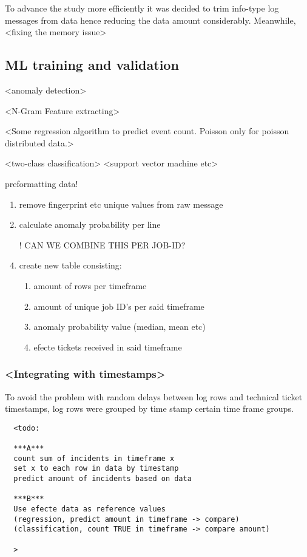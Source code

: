 To advance the study more efficiently
it was decided to trim info-type log messages from data
hence reducing the data amount considerably.
Meanwhile,
<fixing the memory issue>

\subsection{ML training and validation}\label{subsec:ml-training-and-validation}

<anomaly detection>

<N-Gram Feature extracting>

<Some regression algorithm to predict event count.
Poisson only for poisson distributed data.>

<two-class classification>
<support vector machine etc>

preformatting data! \\
\begin{enumerate}
    \item remove fingerprint etc unique values from raw message
    \item calculate anomaly probability per line
    \item [!] CAN WE COMBINE THIS PER JOB-ID?
    \item create new table consisting:
    \begin{enumerate}
        \item amount of rows per timeframe
        \item amount of unique job ID's per said timeframe
        \item anomaly probability value (median, mean etc)
        \item efecte tickets received in said timeframe
    \end{enumerate}
\end{enumerate}

\subsubsection*{<Integrating with timestamps>}
To avoid the problem with random delays
between log rows and technical ticket timestamps,
log rows were grouped by time stamp
certain time frame groups.

\begin{verbatim}
  <todo:

  ***A***
  count sum of incidents in timeframe x
  set x to each row in data by timestamp
  predict amount of incidents based on data

  ***B***
  Use efecte data as reference values
  (regression, predict amount in timeframe -> compare)
  (classification, count TRUE in timeframe -> compare amount)

  >
\end{verbatim}






\clearpage